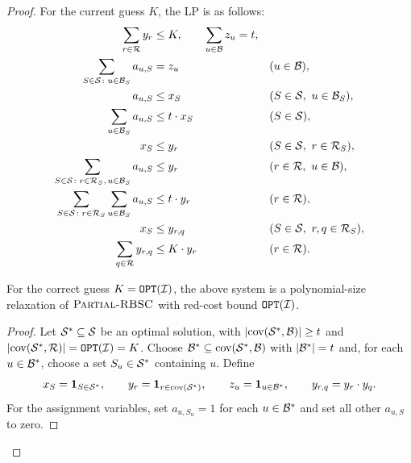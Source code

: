 \begin{proof}
For the current guess $K$, the LP is as follows:
\begin{align}
 \sum_{r\in\mathcal{R}}y_r&\leq K, \quad\quad \sum_{u\in\mathcal{B}}z_u=t, && \label{eq:rbsc-lp-budget}\\
 \sum_{S\in\mathcal{S}\colon u\in \mathcal{B}_S}a_{u,S}&=z_u &&(u\in\mathcal{B}), \label{eq:rbsc-lp-assign}\\
 a_{u,S}&\leq x_S &&(S\in\mathcal{S},\ u\in \mathcal{B}_S), \label{eq:rbsc-lp-marginal}\\
 \sum_{u\in \mathcal{B}_S}a_{u,S}&\leq t\cdot x_S &&(S\in\mathcal{S}), \label{eq:rbsc-lp-set}\\
 x_S&\leq y_r &&(S\in\mathcal{S},\ r\in \mathcal{R}_S), \label{eq:rbsc-lp-red}\\
 \sum_{S\in\mathcal{S}\colon r\in \mathcal{R}_S,\,u\in \mathcal{B}_S}a_{u,S}&\leq y_r &&(r\in\mathcal{R},\ u\in\mathcal{B}), \label{eq:rbsc-lp-blue-load}\\
 \sum_{S\in\mathcal{S}\colon r\in \mathcal{R}_S}\sum_{u\in \mathcal{B}_S}a_{u,S}&\leq t\cdot y_r &&(r\in\mathcal{R}), \label{eq:rbsc-lp-total-load}\\
 x_S&\leq y_{r,q} &&(S\in\mathcal{S},\ r,q\in \mathcal{R}_S), \label{eq:rbsc-lp-pair}\\
 \sum_{q\in\mathcal{R}}y_{r,q}&\leq K\cdot y_r &&(r\in\mathcal{R}). \label{eq:rbsc-lp-pair-budget}
\end{align}

\begin{claim}\label{claim:rbsc-lp-validity}
For the correct guess $K=\texttt{OPT}\mathopen{}\left( \mathcal{I} \right)$, the above system is a polynomial-size relaxation of $\textup{\textsc{Partial-RBSC}}$ with red-cost bound $\texttt{OPT}\mathopen{}\left( \mathcal{I} \right)$.
\end{claim}
\begin{proof}
Let $\mathcal{S}^*\subseteq\mathcal{S}$ be an optimal solution, with $\mathopen{}\left| \operatorname{cov}\mathopen{}\left( \mathcal{S}^*,\mathcal{B} \right) \right|\geq t$ and $\mathopen{}\left| \operatorname{cov}\mathopen{}\left( \mathcal{S}^*,\mathcal{R} \right) \right|=\texttt{OPT}\mathopen{}\left( \mathcal{I} \right)=K$. Choose $\mathcal{B}^*\subseteq\operatorname{cov}\mathopen{}\left( \mathcal{S}^*,\mathcal{B} \right)$ with $\mathopen{}\left| \mathcal{B}^* \right|=t$ and, for each $u\in\mathcal{B}^*$, choose a set $S_u\in\mathcal{S}^*$ containing $u$. Define
\[
 x_S=\boldsymbol{1}_{S\in\mathcal{S}^*},\qquad
 y_r=\boldsymbol{1}_{r\in\operatorname{cov}\mathopen{}\left( \mathcal{S}^* \right)},\qquad
 z_u=\boldsymbol{1}_{u\in\mathcal{B}^*},\qquad
 y_{r,q}=y_r\cdot y_q.
\]
For the assignment variables, set $a_{u,S_u}=1$ for each $u\in\mathcal{B}^*$ and set all other $a_{u,S}$ to zero.


\end{proof}
\end{proof}
